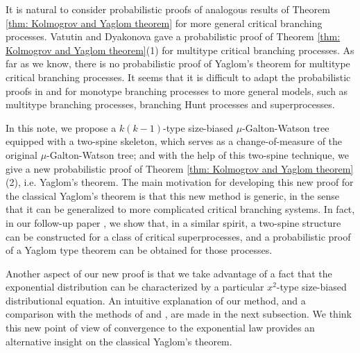 \documentclass[ECP]{ejpecp} %
\begin{document}
It is natural to consider probabilistic proofs of analogous results of Theorem \ref{thm: Kolmogrov and Yaglom theorem} for more general critical branching processes.
Vatutin and  Dyakonova \cite{VD} gave a probabilistic proof of Theorem \ref{thm: Kolmogrov and Yaglom theorem}(1) for multitype critical branching processes.
As far as we know, there is no probabilistic proof of Yaglom's theorem for multitype critical branching processes.
It seems that it is difficult to adapt the probabilistic proofs in \cite{geiger2000new} and \cite{lyons1995conceptual} for monotype branching processes to more general models, such as multitype branching processes, branching Hunt processes and superprocesses.

In this note, we propose a $k(k-1)$-type size-biased $\mu$-Galton-Watson tree equipped with a two-spine skeleton, which serves as a change-of-measure of the original $\mu$-Galton-Watson tree;
and with the help of this two-spine technique, we give a new probabilistic proof of Theorem \ref{thm: Kolmogrov and Yaglom theorem}(2), i.e. Yaglom's theorem.
The main motivation for developing this new proof for the classical Yaglom's theorem is that this new method is generic, in the sense that it can be generalized to more complicated critical branching systems.
In fact, in our	follow-up
paper \cite{RenSongSun2017Spine}, we show that, in a similar spirit, a two-spine structure can be constructed for a class of critical superprocesses, and a probabilistic proof of a Yaglom type theorem can be obtained for those processes.



Another aspect of our new proof is that we take advantage of a fact that the exponential distribution can be characterized by a particular $x^2$-type size-biased distributional equation.
An intuitive explanation of our method,
and a comparison with the methods of \cite{geiger2000new} and \cite{lyons1995conceptual}, are
made in the next subsection.
We think this new point of view of convergence to the exponential law provides an alternative insight on the classical Yaglom's theorem.
\end{document}
